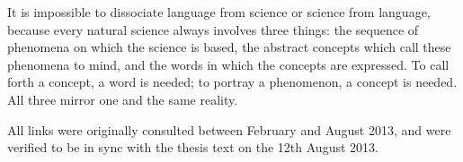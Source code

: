 \documentclass[a4paper, 11pt, twoside, openright]{report}
\begin{document}

\cleardoublepage
\thispagestyle{empty}
\null\vfill

\newlength\longest
\setlength{\longest}{15cm}
\centering
\parbox{\longest}{\Large \raggedright{It is impossible to dissociate language
    from science or science from language, because every natural science always
    involves three things: the sequence of phenomena on which the science is
    based, the abstract concepts which call these phenomena to mind, and the
    words in which the concepts are expressed. To call forth a concept, a word
    is needed; to portray a phenomenon, a concept is needed.  All three mirror
    one and the same reality.}

}

\vfill\vfill
\cleardoublepage
\raggedright


\setcounter{tocdepth}{2}
\tableofcontents











\begin{appendices}

\end{appendices}




\nocite{*}

All links were originally consulted between February and August 2013, and were
verified to be in sync with the thesis text on the 12th August 2013.
\end{document}
